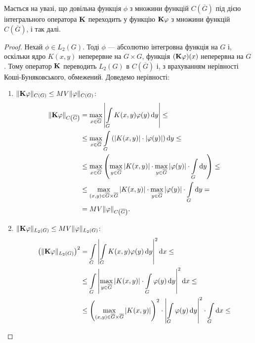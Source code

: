 \begin{remark}
	Мається на увазі, що довільна функція $\phi$ з множини функцій $C\left(\overline G\right)$ під дією інтегрального оператора $\bf{K}$ переходить у функцію $\bf{K}\phi$ з множини функцій $C\left(\overline G\right)$, і так далі.
\end{remark}

\begin{proof}
	Нехай $\phi \in L_2(G)$. Тоді $\phi$ --- абсолютно інтегровна функція на $G$ і, оскільки ядро $K(x, y)$ неперервне на $G \times G$, функція $(\bf{K}\phi)(x)$ неперервна на $G$. Тому оператор $\bf{K}$ переводить $L_2(G)$ в $C\left(\overline G\right)$ і, з врахуванням нерівності Коші-Буняковського, обмежений. Доведемо нерівності:
	\begin{enumerate}
		\item $\| \bf{K} \phi \|_{C(G)} \le M V \| \phi \|_{C(G)}$:
		\begin{equation}
			\begin{aligned}
				\| \bf{K} \phi \|_{C\left(\overline G\right)} &= \Max_{x \in \overline G} \left| \Int_G K(x, y) \phi(y) \diff y \right| \le \\
				&\le \Max_{x \in \overline G} \Int_G \left( |K(x, y)| \cdot |\phi(y)| \right) \diff y \le \\
				&\le \Max_{x \in \overline G} \left( \Max_{y \in \overline G} |K(x, y)| \cdot \Max_{y \in \overline G} |\phi(y)| \cdot \Int_G \diff y \right) \le \\
				&\le \Max_{(x, y) \in \overline G \times \overline G} |K(x, y)| \cdot \Max_{y \in \overline G} |\phi(y)| \cdot \Int_G \diff y = \\
				&= M V \|\phi\|_{C\left(\overline G\right)}.
			\end{aligned}
		\end{equation}
		\item $\| \bf{K} \phi \|_{L_2(G)} \le M V \| \phi \|_{L_2(G)}$:
		\begin{equation}
			\begin{aligned}
				\left( \| \bf{K} \phi \|_{L_2(G)} \right)^2 &= \Int_G \left| \Int_G K(x, y) \phi(y) \diff y \right|^2 \diff x \le \\
				&\le \Int_G \left| \Max_{y \in \overline G} |K(x, y)| \cdot \Int_G \phi(y) \diff y \right|^2 \diff x \le \\
				&\le \left( \Max_{(x, y) \in \overline G \times \overline G} |K(x, y)| \right)^2 \cdot \left| \Int_G \phi(y) \diff y \right|^2 \cdot \Int_G \diff x \le \\

\end{aligned}
\end{equation}
\end{enumerate}
\end{proof}
